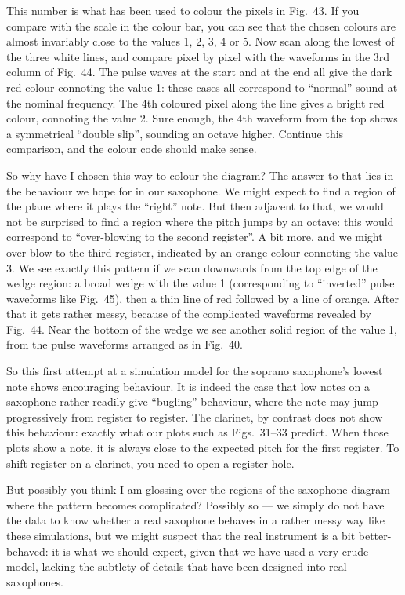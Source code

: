   This number is what has been used to colour the pixels in Fig.\ 43. If you 
  compare with the scale in the colour bar, you can see that the chosen colours 
  are almost invariably close to the values 1, 2, 3, 4 or 5. Now scan along the 
  lowest of the three white lines, and compare pixel by pixel with the 
  waveforms in the 3rd column of Fig.\ 44. The pulse waves at the start and at 
  the end all give the dark red colour connoting the value 1: these cases all 
  correspond to ``normal'' sound at the nominal frequency. The 4th coloured 
  pixel along the line gives a bright red colour, connoting the value 2. Sure 
  enough, the 4th waveform from the top shows a symmetrical “double slip”, 
  sounding an octave higher. Continue this comparison, and the colour code 
  should make sense. 

  So why have I chosen this way to colour the diagram? The answer to that lies 
  in the behaviour we hope for in our saxophone. We might expect to find a 
  region of the plane where it plays the “right” note. But then adjacent to 
  that, we would not be surprised to find a region where the pitch jumps by an 
  octave: this would correspond to “over-blowing to the second register”. A bit 
  more, and we might over-blow to the third register, indicated by an orange 
  colour connoting the value 3. We see exactly this pattern if we scan 
  downwards from the top edge of the wedge region: a broad wedge with the value 
  1 (corresponding to “inverted” pulse waveforms like Fig.\ 45), then a thin 
  line of red followed by a line of orange. After that it gets rather messy, 
  because of the complicated waveforms revealed by Fig.\ 44. Near the bottom of 
  the wedge we see another solid region of the value 1, from the pulse 
  waveforms arranged as in Fig.\ 40. 

  So this first attempt at a simulation model for the soprano saxophone’s 
  lowest note shows encouraging behaviour. It is indeed the case that low notes 
  on a saxophone rather readily give ``bugling'' behaviour, where the note may 
  jump progressively from register to register. The clarinet, by contrast does 
  not show this behaviour: exactly what our plots such as Figs.\ 31--33 
  predict. When those plots show a note, it is always close to the expected 
  pitch for the first register. To shift register on a clarinet, you need to 
  open a register hole. 

  But possibly you think I am glossing over the regions of the saxophone 
  diagram where the pattern becomes complicated? Possibly so --- we simply do 
  not have the data to know whether a real saxophone behaves in a rather messy 
  way like these simulations, but we might suspect that the real instrument is 
  a bit better-behaved: it is what we should expect, given that we have used a 
  very crude model, lacking the subtlety of details that have been designed 
  into real saxophones. 

